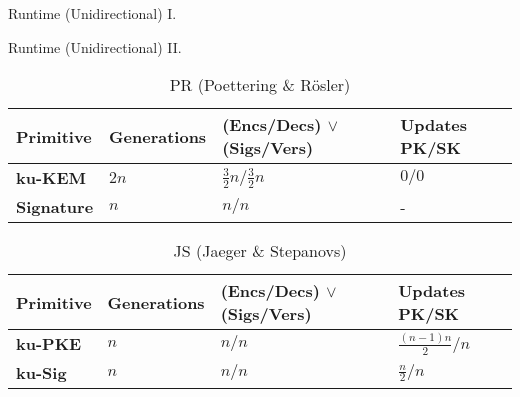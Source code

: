 \documentclass{beamer}
\begin{document}
\begin{frame}{Runtime (Unidirectional) I.}
  \begin{figure}[H]
    \centering
     
  \end{figure}
\end{frame}

\begin{frame}{Runtime (Unidirectional) II.}
  \scriptsize
  \begin{table}
    \caption*{PR (Poettering \& Rösler)}
    \begin{tabular}{ | l | l | l | l |}
    \hline
    Primitive & Generations & (Encs/Decs) $\vee$ (Sigs/Vers) & Updates PK/SK \\ \hline
    \textbf{ku-KEM} & $2n$ & $\frac{3}{2}n/\frac{3}{2}n$ & $0/0$ \\ \hline
    \textbf{Signature} & $n$ & $n/n$ & - \\  
    \hline
    \end{tabular}
  \end{table}
  \begin{table}
    \caption*{JS (Jaeger \& Stepanovs)}
    \begin{tabular}{ | l | l | l | l |}
    \hline
    Primitive & Generations & (Encs/Decs) $\vee$ (Sigs/Vers) & Updates PK/SK \\ \hline
    \textbf{ku-PKE} & $n$ & $n/n$ & $\frac{(n-1)n}{2}/n$ \\ \hline
    \textbf{ku-Sig} & $n$ & $n/n$ & $\frac{n}{2}/n$ \\  
    \hline
    \end{tabular}
  \end{table}
\end{frame}
\end{document}
